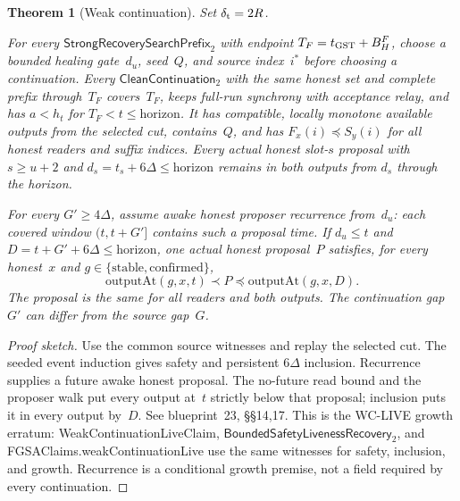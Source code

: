 \documentclass{article}
\theoremstyle{plain}
\newtheorem{theorem}{Theorem}
\theoremstyle{definition}
\theoremstyle{remark}
\begin{document}
\begin{theorem}[Weak continuation]
\label{thm:weak-continuation-live}
Set $\delta_{\rm t}=2R$.

For every
$\textsf{StrongRecoverySearchPrefix}_2$ with endpoint
$T_F=t_{\rm GST}+B_H^F$, choose a bounded healing gate~$d_u$,
seed~$Q$, and source index~$i^*$ before choosing a continuation.
Every $\textsf{CleanContinuation}_2$ with the same honest set and
complete prefix through~$T_F$ covers~$T_F$, keeps full-run synchrony
with acceptance relay, and has $a<h_t$ for
$T_F<t\leq\mathrm{horizon}$.  It has compatible, locally monotone
available outputs from the selected cut, contains~$Q$, and has
$F_x(i)\preceq S_y(i)$ for all honest readers and suffix indices.
Every actual honest slot-$s$ proposal with $s\geq u+2$ and
$d_s=t_s+6\Delta\leq\mathrm{horizon}$ remains in both outputs from
$d_s$ through the horizon.

For every $G'\geq4\Delta$, assume awake honest proposer recurrence
from~$d_u$: each covered window $(t,t+G']$ contains such a proposal
time.  If $d_u\leq t$ and $D=t+G'+6\Delta\leq\mathrm{horizon}$,
one actual honest proposal~$P$ satisfies, for every honest~$x$ and
$g\in\{\mathrm{stable},\mathrm{confirmed}\}$,
\[
 \mathrm{outputAt}(g,x,t)\prec P
 \preceq\mathrm{outputAt}(g,x,D).
\]
The proposal is the same for all readers and both outputs.  The
continuation gap~$G'$ can differ from the source gap~$G$.
\end{theorem}

\begin{proof}[Proof sketch]
Use the common source witnesses and replay the selected cut.  The
seeded event induction gives safety and persistent $6\Delta$
inclusion.  Recurrence supplies a future awake honest proposal.
The no-future read bound and the proposer walk put every output at~$t$
strictly below that proposal; inclusion puts it in every output by~$D$.
See blueprint~23, \S\S14,17.  This is the WC-LIVE growth erratum:
\textsf{WeakContinuationLiveClaim},
$\textsf{BoundedSafetyLivenessRecovery}_2$, and
\textsf{FGSAClaims.weakContinuationLive} use the same witnesses for
safety, inclusion, and growth.  Recurrence is a conditional growth
premise, not a field required by every continuation.
\end{proof}
\end{document}
